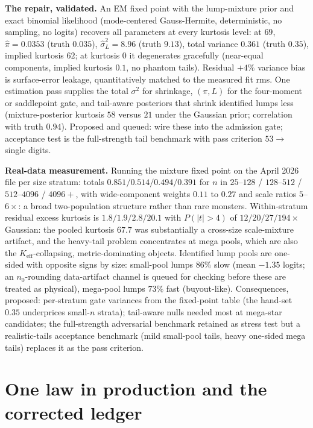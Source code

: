 \documentclass[11pt]{article}
\begin{document}
\textbf{The repair, validated.} An EM fixed point with the lump-mixture
prior and exact binomial likelihood (mode-centered Gauss-Hermite,
deterministic, no sampling, no logits) recovers all parameters at every
kurtosis level: at $69$, $\hat\pi = 0.0353$ (truth $0.035$),
$\hat\sigma_L^2 = 8.96$ (truth $9.13$), total variance $0.361$ (truth
$0.35$), implied kurtosis $62$; at kurtosis $0$ it degenerates
gracefully (near-equal components, implied kurtosis $0.1$, no phantom
tails). Residual $+4\%$ variance bias is surface-error leakage,
quantitatively matched to the measured fit rms. One estimation pass
supplies the total $\sigma^2$ for shrinkage, $(\pi, L)$ for the
four-moment or saddlepoint gate, and tail-aware posteriors that shrink
identified lumps less (mixture-posterior kurtosis $58$ versus $21$
under the Gaussian prior; correlation with truth $0.94$). Proposed and
queued: wire these into the admission gate; acceptance test is the
full-strength tail benchmark with pass criterion $53 \to$ single
digits.


\textbf{Real-data measurement.} Running the
mixture fixed point on the April 2026 file per size stratum: totals
$0.851 / 0.514 / 0.494 / 0.391$ for $n$ in $25$--$128$ / $128$--$512$ /
$512$--$4096$ / $4096{+}$, with wide-component weights $0.11$ to $0.27$
and scale ratios $5$--$6\times$: a broad two-population structure
rather than rare monsters. Within-stratum residual excess kurtosis is
$1.8 / 1.9 / 2.8 / 20.1$ with $P(|t|>4)$ of $12/20/27/194\times$
Gaussian: the pooled kurtosis $67.7$ was substantially a cross-size
scale-mixture artifact, and the heavy-tail problem concentrates at mega
pools, which are also the $K_{\mathrm{eff}}$-collapsing,
metric-dominating objects. Identified lump pools are one-sided with
opposite signs by size: small-pool lumps $86\%$ slow (mean $-1.35$
logits; an $n_0$-rounding data-artifact channel is queued for checking
before these are treated as physical), mega-pool lumps $73\%$ fast
(buyout-like). Consequences, proposed: per-stratum gate variances from
the fixed-point table (the hand-set $0.35$ underprices small-$n$
strata); tail-aware nulls needed most at mega-star candidates; the
full-strength adversarial benchmark retained as stress test but a
realistic-tails acceptance benchmark (mild small-pool tails, heavy
one-sided mega tails) replaces it as the pass criterion.


\section{One law in production and the corrected ledger}\label{sec:onelaw}
\end{document}
